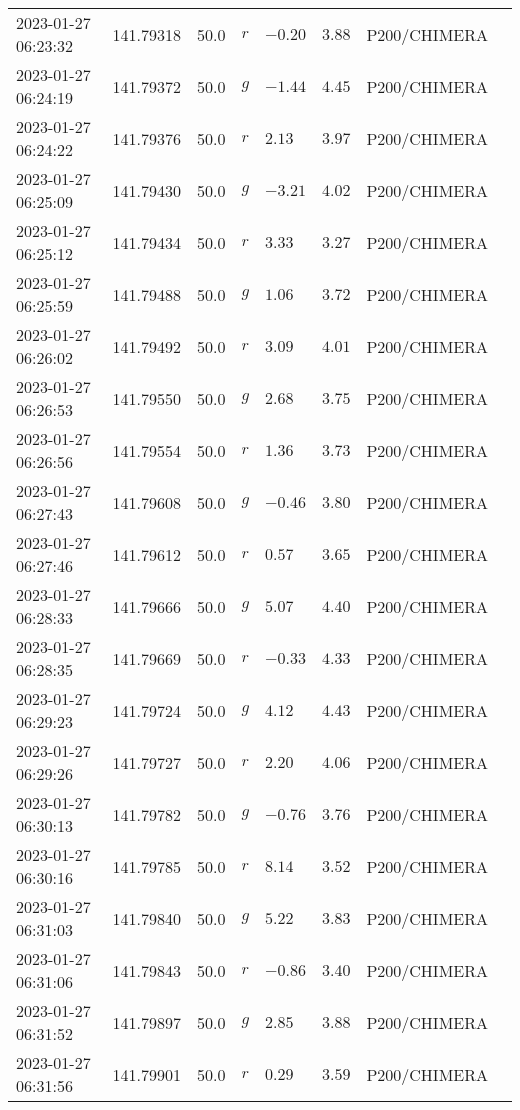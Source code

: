 \documentclass{nature_plusfigure}
\begin{document}
\begin{supplement}
\begin{center}
\begin{longtable}{llllllll}
2023-01-27 06:23:32 & 141.79318 & 50.0 & $r$ & $-0.20$ & $3.88$ & P200/CHIMERA &  \\ 
2023-01-27 06:24:19 & 141.79372 & 50.0 & $g$ & $-1.44$ & $4.45$ & P200/CHIMERA &  \\ 
2023-01-27 06:24:22 & 141.79376 & 50.0 & $r$ & $2.13$ & $3.97$ & P200/CHIMERA &  \\ 
2023-01-27 06:25:09 & 141.79430 & 50.0 & $g$ & $-3.21$ & $4.02$ & P200/CHIMERA &  \\ 
2023-01-27 06:25:12 & 141.79434 & 50.0 & $r$ & $3.33$ & $3.27$ & P200/CHIMERA &  \\ 
2023-01-27 06:25:59 & 141.79488 & 50.0 & $g$ & $1.06$ & $3.72$ & P200/CHIMERA &  \\ 
2023-01-27 06:26:02 & 141.79492 & 50.0 & $r$ & $3.09$ & $4.01$ & P200/CHIMERA &  \\ 
2023-01-27 06:26:53 & 141.79550 & 50.0 & $g$ & $2.68$ & $3.75$ & P200/CHIMERA &  \\ 
2023-01-27 06:26:56 & 141.79554 & 50.0 & $r$ & $1.36$ & $3.73$ & P200/CHIMERA &  \\ 
2023-01-27 06:27:43 & 141.79608 & 50.0 & $g$ & $-0.46$ & $3.80$ & P200/CHIMERA &  \\ 
2023-01-27 06:27:46 & 141.79612 & 50.0 & $r$ & $0.57$ & $3.65$ & P200/CHIMERA &  \\ 
2023-01-27 06:28:33 & 141.79666 & 50.0 & $g$ & $5.07$ & $4.40$ & P200/CHIMERA &  \\ 
2023-01-27 06:28:35 & 141.79669 & 50.0 & $r$ & $-0.33$ & $4.33$ & P200/CHIMERA &  \\ 
2023-01-27 06:29:23 & 141.79724 & 50.0 & $g$ & $4.12$ & $4.43$ & P200/CHIMERA &  \\ 
2023-01-27 06:29:26 & 141.79727 & 50.0 & $r$ & $2.20$ & $4.06$ & P200/CHIMERA &  \\ 
2023-01-27 06:30:13 & 141.79782 & 50.0 & $g$ & $-0.76$ & $3.76$ & P200/CHIMERA &  \\ 
2023-01-27 06:30:16 & 141.79785 & 50.0 & $r$ & $8.14$ & $3.52$ & P200/CHIMERA &  \\ 
2023-01-27 06:31:03 & 141.79840 & 50.0 & $g$ & $5.22$ & $3.83$ & P200/CHIMERA &  \\ 
2023-01-27 06:31:06 & 141.79843 & 50.0 & $r$ & $-0.86$ & $3.40$ & P200/CHIMERA &  \\ 
2023-01-27 06:31:52 & 141.79897 & 50.0 & $g$ & $2.85$ & $3.88$ & P200/CHIMERA &  \\ 
2023-01-27 06:31:56 & 141.79901 & 50.0 & $r$ & $0.29$ & $3.59$ & P200/CHIMERA &  \\ 

\end{longtable}
\end{center}
\end{supplement}
\end{document}
